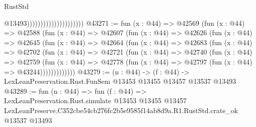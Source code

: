 \begin{lexlean}{RustStd}
\begin{coremodule}
                                              @13493)))))))))))))))))))))
@43271 := fun (x : @44) =>
  @42569
    (fun (x : @44) =>
    @42588
      (fun (x : @44) =>
      @42607
        (fun (x : @44) =>
        @42626
          (fun (x : @44) =>
          @42645
            (fun (x : @44) =>
            @42664
              (fun (x : @44) =>
              @42683
                (fun (x : @44) =>
                @42702
                  (fun (x : @44) =>
                  @42721
                    (fun (x : @44) =>
                    @42740
                      (fun (x : @44) =>
                      @42759
                        (fun (x : @44) =>
                        @42778 (fun (x : @44) => @42797 (fun (x : @44) => @43244)))))))))))))
@43279 := (n : @44) ->
  (f : @44) -> LexLeanPreservation.Rust.FunSem @13453 @13455 @13457 @13537 @13493
@43289 := fun (n : @44) =>
  fun (f : @44) =>
  LexLeanPreservation.Rust.simulate
    @13453
    @13455
    @13457
    LexLeanPreserve.C352cbe54cb276fc2b5e9585f14ab8d9a.R1.RustStd.crate_ok
    @13537
    @13493
\end{coremodule}
\end{lexlean}
